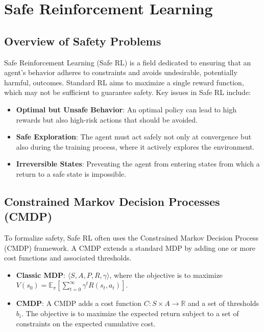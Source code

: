\documentclass[12pt]{article}
\begin{document}
\section{Safe Reinforcement Learning   }

\subsection{Overview of Safety Problems}
Safe Reinforcement Learning (Safe RL) is a field dedicated to ensuring that an agent's behavior adheres to constraints and avoids undesirable, potentially harmful, outcomes. Standard RL aims to maximize a single reward function, which may not be sufficient to guarantee safety. Key issues in Safe RL include:
\begin{itemize}
    \item \textbf{Optimal but Unsafe Behavior}: An optimal policy can lead to high rewards but also high-risk actions that should be avoided.
    \item \textbf{Safe Exploration}: The agent must act safely not only at convergence but also during the training process, where it actively explores the environment.
    \item \textbf{Irreversible States}: Preventing the agent from entering states from which a return to a safe state is impossible.
\end{itemize}

\subsection{Constrained Markov Decision Processes (CMDP)}
To formalize safety, Safe RL often uses the Constrained Markov Decision Process (CMDP) framework. A CMDP extends a standard MDP by adding one or more cost functions and associated thresholds.
\begin{itemize}
    \item \textbf{Classic MDP}: $\langle S, A, P, R, \gamma \rangle$, where the objective is to maximize $V(s_0) = \mathbb{E}_\pi \left[ \sum_{t=0}^\infty \gamma^t R(s_t, a_t) \right]$.
    \item \textbf{CMDP}: A CMDP adds a cost function $C: S \times A \to \mathbb{R}$ and a set of thresholds $b_i$. The objective is to maximize the expected return subject to a set of constraints on the expected cumulative cost.
\end{itemize}
\end{document}
